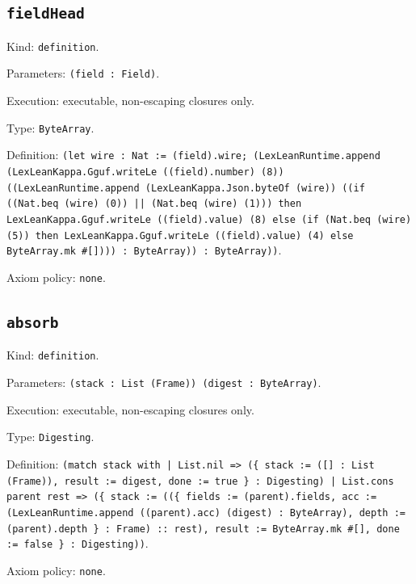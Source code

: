 \documentclass[11pt]{article}
\begin{document}
\subsection*{\texttt{fieldHead}}
\noindent Kind: \texttt{definition}.\par
\noindent Parameters: \texttt{(field : Field)}.\par
\noindent Execution: executable, non-escaping closures only.\par
\noindent Type: \texttt{ByteArray}.\par
\noindent Definition: \texttt{(let wire : Nat := (field).wire; (LexLeanRuntime.append (LexLeanKappa.Gguf.writeLe ((field).number) (8)) ((LexLeanRuntime.append (LexLeanKappa.Json.byteOf (wire)) ((if ((Nat.beq (wire) (0)) || (Nat.beq (wire) (1))) then LexLeanKappa.Gguf.writeLe ((field).value) (8) else (if (Nat.beq (wire) (5)) then LexLeanKappa.Gguf.writeLe ((field).value) (4) else ByteArray.mk \#[]))) : ByteArray)) : ByteArray))}.\par
\noindent Axiom policy: \texttt{none}.\par
\subsection*{\texttt{absorb}}
\noindent Kind: \texttt{definition}.\par
\noindent Parameters: \texttt{(stack : List (Frame)) (digest : ByteArray)}.\par
\noindent Execution: executable, non-escaping closures only.\par
\noindent Type: \texttt{Digesting}.\par
\noindent Definition: \texttt{(match stack with | List.nil => (\{ stack := ([] : List (Frame)), result := digest, done := true \} : Digesting) | List.cons parent rest => (\{ stack := ((\{ fields := (parent).fields, acc := (LexLeanRuntime.append ((parent).acc) (digest) : ByteArray), depth := (parent).depth \} : Frame) :: rest), result := ByteArray.mk \#[], done := false \} : Digesting))}.\par
\noindent Axiom policy: \texttt{none}.\par
\end{document}
